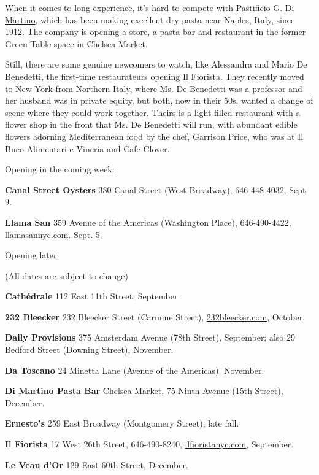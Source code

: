 When it comes to long experience, it's hard to compete with
\href{http://www.pastadimartino.com/pastificio/homepage-eng.php}{Pastificio
G. Di Martino}, which has been making excellent dry pasta near Naples,
Italy, since 1912. The company is opening a store, a pasta bar and
restaurant in the former Green Table space in Chelsea Market.

Still, there are some genuine newcomers to watch, like Alessandra and
Mario De Benedetti, the first-time restaurateurs opening Il Fiorista.
They recently moved to New York from Northern Italy, where Ms. De
Benedetti was a professor and her husband was in private equity, but
both, now in their 50s, wanted a change of scene where they could work
together. Theirs is a light-filled restaurant with a flower shop in the
front that Ms. De Benedetti will run, with abundant edible flowers
adorning Mediterranean food by the chef,
\href{https://www.chefsfeed.com/experts/1497-garrison-price}{Garrison
Price}, who was at Il Buco Alimentari e Vineria and Cafe Clover.

Opening in the coming week:

\textbf{Canal Street Oysters} 380 Canal Street (West Broadway),
646-448-4032, Sept. 9.

\textbf{Llama San} 359 Avenue of the Americas (Washington Place),
646-490-4422, \href{http://llamasannyc.com/}{llamasannyc.com}. Sept. 5.

Opening later:

(All dates are subject to change)

\textbf{Cathédrale} 112 East 11th Street, September.

\textbf{232 Bleecker} 232 Bleecker Street (Carmine Street),
\href{https://www.232bleecker.com/}{232bleecker.com}, October.

\textbf{Daily Provisions} 375 Amsterdam Avenue (78th Street), September;
also 29 Bedford Street (Downing Street), November.

\textbf{Da Toscano} 24 Minetta Lane (Avenue of the Americas). November.

\textbf{Di Martino Pasta Bar} Chelsea Market, 75 Ninth Avenue (15th
Street), December.

\textbf{Ernesto's} 259 East Broadway (Montgomery Street), late fall.

\textbf{Il Fiorista} 17 West 26th Street, 646-490-8240,
\href{http://ilfioristanyc.com/}{ilfioristanyc.com}, September.

\textbf{Le Veau d'Or} 129 East 60th Street, December.

